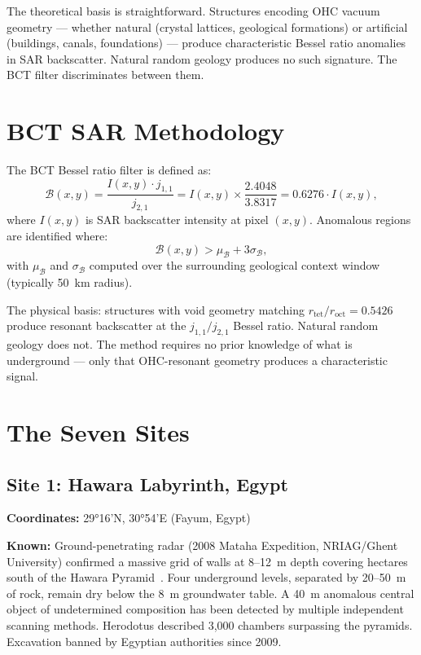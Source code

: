 \documentclass[12pt,twocolumn]{article}
\begin{document}
The theoretical basis is straightforward. Structures encoding
OHC vacuum geometry --- whether natural (crystal lattices,
geological formations) or artificial (buildings, canals,
foundations) --- produce characteristic Bessel ratio anomalies
in SAR backscatter. Natural random geology produces no such
signature. The BCT filter discriminates between them.

\section{BCT SAR Methodology}

The BCT Bessel ratio filter is defined as:
\begin{equation}
\mathcal{B}(x,y) = \frac{I(x,y) \cdot j_{1,1}}{j_{2,1}}
= I(x,y) \times \frac{2.4048}{3.8317} = 0.6276 \cdot I(x,y),
\end{equation}
where $I(x,y)$ is SAR backscatter intensity at pixel $(x,y)$.
Anomalous regions are identified where:
\begin{equation}
\mathcal{B}(x,y) > \mu_\mathcal{B} + 3\sigma_\mathcal{B},
\end{equation}
with $\mu_\mathcal{B}$ and $\sigma_\mathcal{B}$ computed over
the surrounding geological context window (typically 50~km radius).

The physical basis: structures with void geometry matching
$r_\mathrm{tet}/r_\mathrm{oct} = 0.5426$ produce resonant
backscatter at the $j_{1,1}/j_{2,1}$ Bessel ratio. Natural
random geology does not. The method requires no prior knowledge
of what is underground --- only that OHC-resonant geometry
produces a characteristic signal.

\section{The Seven Sites}

\subsection{Site 1: Hawara Labyrinth, Egypt}

\textbf{Coordinates:} 29°16'N, 30°54'E (Fayum, Egypt)

\textbf{Known:} Ground-penetrating radar (2008 Mataha Expedition,
NRIAG/Ghent University) confirmed a massive grid of walls at
8--12~m depth covering hectares south of the Hawara
Pyramid~\cite{Mataha2008}. Four underground levels, separated
by 20--50~m of rock, remain dry below the 8~m groundwater table.
A 40~m anomalous central object of undetermined composition
has been detected by multiple independent scanning methods.
Herodotus described 3,000 chambers surpassing the pyramids.
Excavation banned by Egyptian authorities since 2009.
\end{document}
